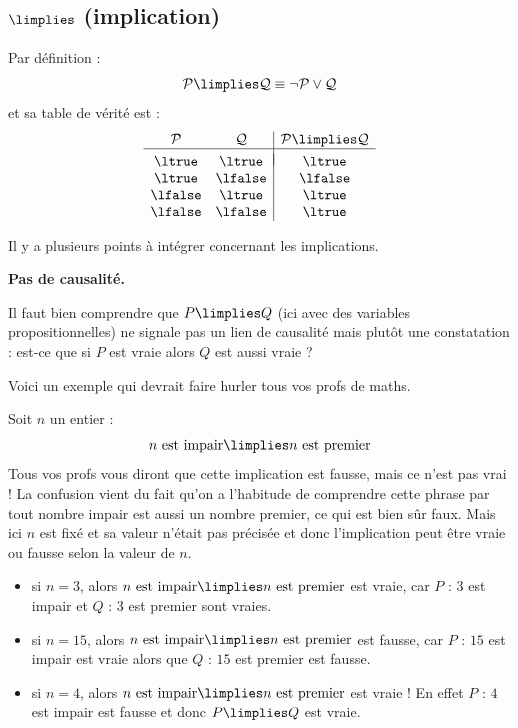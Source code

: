 \documentclass[11pt,class=report,crop=false]{standalone}
\begin{document}
\subsection{$\limplies$ (implication)}

Par définition :
\[
\mathcal{P} \limplies \mathcal{Q} \equiv \lnot \mathcal{P} \lor \mathcal{Q}
\]
et sa table de vérité est :
\[
\begin{array}{c c | c}
	\mathcal{P}		& \mathcal{Q} 		& \mathcal{P} \limplies \mathcal{Q} \\
	\hline
	&&	\\[-2ex]
	\ltrue 	& \ltrue 	& \ltrue \\
	\ltrue 	& \lfalse 	& \lfalse \\
	\lfalse & \ltrue 	& \ltrue \\	
	\lfalse & \lfalse 	& \ltrue \\		
\end{array}
\]

Il y a plusieurs points à intégrer concernant les implications.

\medskip

\textbf{Pas de causalité.} 

Il faut bien comprendre que $P \limplies Q$ (ici avec des variables propositionnelles) ne signale pas un lien de causalité mais plutôt une constatation : est-ce que si $P$ est vraie alors $Q$ est aussi vraie ?


Voici un exemple qui devrait faire hurler tous vos profs de maths.
\begin{exemple}
 Soit $n$ un entier :
\[
n \text { est impair} \limplies n \text{ est premier}
\]
Tous vos profs vous diront que cette implication est fausse, mais ce n'est pas vrai !
La confusion vient du fait qu'on a l'habitude de comprendre cette phrase par \og{}tout nombre impair est aussi un nombre premier\fg{}, ce qui est bien sûr faux.
Mais ici $n$ est fixé et sa valeur n'était pas précisée et donc l'implication peut être vraie ou fausse selon la valeur de $n$.

\begin{itemize}
	\item si $n=3$, alors \og{}$n \text { est impair} \limplies n \text{ est premier}$\fg{} est vraie, car $P$ : \og{}$3$ est impair\fg{} et $Q$ : \og{}$3$ est premier\fg{} sont vraies.
	
	\item si $n=15$, alors \og{}$n \text { est impair} \limplies n \text{ est premier}$\fg{} est fausse, car $P$ : \og{}$15$ est impair\fg{} est vraie alors que $Q$ : \og{}$15$ est premier\fg{} est fausse.
	
	\item si $n=4$, alors \og{}$n \text { est impair} \limplies n \text{ est premier}$\fg{} est vraie ! En effet $P$ : \og{}$4$ est impair\fg{} est fausse et donc $P \limplies Q$ est vraie. 
\end{itemize}


\end{exemple}
\end{document}
